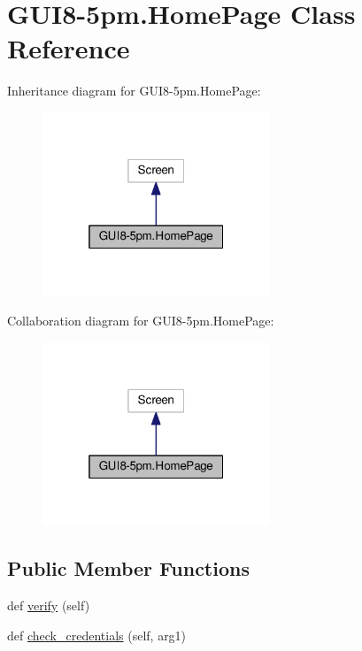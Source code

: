 \hypertarget{classGUI8-5pm_1_1HomePage}{}\section{G\+U\+I8-\/5pm.Home\+Page Class Reference}
\label{classGUI8-5pm_1_1HomePage}


Inheritance diagram for G\+U\+I8-\/5pm.Home\+Page\+:\nopagebreak
\begin{figure}[H]
\begin{center}
\leavevmode
\includegraphics[width=193pt]{classGUI8-5pm_1_1HomePage__inherit__graph}
\end{center}
\end{figure}


Collaboration diagram for G\+U\+I8-\/5pm.Home\+Page\+:\nopagebreak
\begin{figure}[H]
\begin{center}
\leavevmode
\includegraphics[width=193pt]{classGUI8-5pm_1_1HomePage__coll__graph}
\end{center}
\end{figure}
\subsection*{Public Member Functions}
\begin{DoxyCompactItemize}
\item 
def \hyperlink{classGUI8-5pm_1_1HomePage_a0f5b74437a5335f042b84f979131276a}{verify} (self)
\item 
def \hyperlink{classGUI8-5pm_1_1HomePage_ab49e98b3b43f3bef65b02fc2d067f616}{check\+\_\+credentials} (self, arg1)
\end{DoxyCompactItemize}
